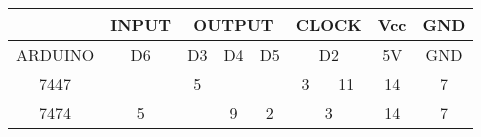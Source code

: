 \begin{tabular}{|c|c|c|c|c|c|c|c|c|}                         
\hline & INPUT & \multicolumn{3}{|c|}{OUTPUT} & \multicolumn{2}{|c|}{CLOCK} & Vcc & GND     \\                                                                   
\hline ARDUINO & D6 & D3 & D4 & D5 &     \multicolumn{2}{|c|}{D2} & 5V & GND \\                              
\hline 7447 & & 5 & & & 3 & 11 & 14 & 7     \\                                                                 
\hline 7474 & 5 && 9 & 2 & \multicolumn{2}{|c|}{3} & 14 & 7 \\                                          
\hline                                     
\end{tabular}                   
